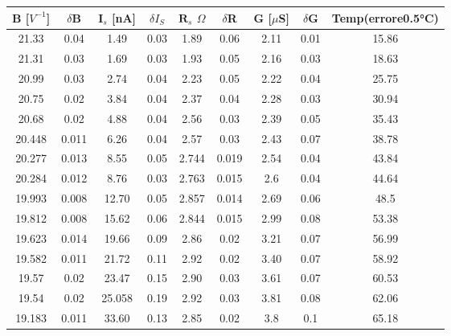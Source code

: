 \documentclass[10pt,letterpaper]{article}
\begin{document}
\begin{table}[h]
\centering
\begin{tabular}{c|c|c|c|c|c|c|c|c}
\hline
\textbf{B} [$V^{-1}$]& $\delta$B & $\textbf{I}_s$ [nA]& $\delta I_S$ & $\textbf{R}_s$ $\Omega$ & $\delta$R & \textbf{G} [$\mu$S]& $\delta$G & Temp(errore0.5°C) \\
\hline
21.33 & 0.04 & 1.49 & 0.03 & 1.89 & 0.06 & 2.11 & 0.01 & 15.86 \\

21.31 & 0.03 & 1.69 & 0.03 & 1.93 & 0.05 & 2.16 & 0.03 & 18.63 \\

20.99 & 0.03 & 2.74 & 0.04 & 2.23 & 0.05 & 2.22 & 0.04 & 25.75 \\

20.75 & 0.02 & 3.84 & 0.04 & 2.37 & 0.04 & 2.28 & 0.03 & 30.94 \\

20.68 & 0.02 & 4.88 & 0.04 & 2.56 & 0.03 & 2.39 & 0.05 & 35.43 \\

20.448 & 0.011 & 6.26 & 0.04 & 2.57 & 0.03 & 2.43 & 0.07 & 38.78 \\

20.277 & 0.013 & 8.55 & 0.05 & 2.744 & 0.019 & 2.54 & 0.04 & 43.84 \\

20.284 & 0.012 & 8.76 & 0.03 & 2.763 & 0.015 & 2.6 & 0.04 & 44.64 \\

19.993 & 0.008 & 12.70 & 0.05 & 2.857 & 0.014 & 2.69 & 0.06 & 48.5 \\

19.812 & 0.008 & 15.62 & 0.06 & 2.844 & 0.015 & 2.99 & 0.08 & 53.38 \\

19.623 & 0.014 & 19.66 & 0.09 & 2.86 & 0.02 & 3.21 & 0.07 & 56.99 \\

19.582 & 0.011 & 21.72 & 0.11 & 2.92 & 0.02 & 3.40 & 0.07 & 58.92 \\

19.57 & 0.02 & 23.47 & 0.15 & 2.90 & 0.03 &   3.61 & 0.07 & 60.53 \\

19.54 & 0.02 & 25.058 & 0.19 & 2.92 & 0.03 &  3.81 & 0.08 & 62.06 \\

19.183 & 0.011 & 33.60 & 0.13 & 2.85 & 0.02 & 3.8 & 0.1 & 65.18 \\
\hline
\end{tabular}
\end{table}
\end{document}
